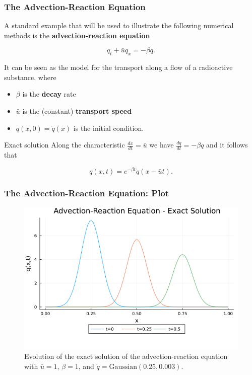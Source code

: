 \documentclass{beamer}
\renewcommand{\emph}[1]{\textcolor{tum}{\textbf{#1}}}
\begin{document}
\begin{frame}
	\frametitle{The Advection-Reaction Equation}

	A standard example that will be used to illustrate the following numerical methods is the \emph{advection-reaction equation}

	\begin{equation}\label{eq:advec}
		q_t + \bar{u}q_x=-\beta q.
	\end{equation}

	It can be seen as the model for the transport along a flow of a radioactive substance, where

	\begin{itemize}
		\item $\beta$ is the \emph{decay} rate
		\item $\bar{u}$ is the (constant) \emph{transport speed}
		\item $q(x,0)= \mathring{q}(x)$ is the initial condition.
	\end{itemize}
	\pause
	\begin{block}{Exact solution}
		Along the characteristic $\frac{dx}{dt}=\bar{u}$ we have $\frac{dq}{dt}=-\beta q$ and it follows that

		\begin{equation}\label{eq:advec_sol}
			q(x,t) = e^{-\beta t}\mathring{q}(x-\bar{u}t).
		\end{equation}
	\end{block}

\end{frame}

\begin{frame}
	\frametitle{The Advection-Reaction Equation: Plot}
	\begin{figure}[!ht]
		\centering
		\includegraphics[width=.7\textwidth]{../Advection.png}

		\caption{Evolution of the exact solution of the advection-reaction equation with $\bar{u}=1$, $\beta=1$, and $\mathring{q}=\text{Gaussian}(0.25,0.003)$.}
		\label{fig:exact}
	\end{figure}
\end{frame}
\end{document}
